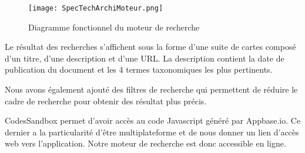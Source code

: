 \begin{figure}[h!]
  \centering
	\texttt{[image: SpecTechArchiMoteur.png]}
	\caption[]{Diagramme fonctionnel du moteur de recherche}
  \label{}
\end{figure}

Le résultat des recherches s'affichent sous la forme d'une suite de cartes composé d'un titre, d'une description et d'une URL\@.
La description contient la date de publication du document et les 4 termes taxonomiques les plus pertinents.

Nous avons également ajouté des filtres de recherche qui permettent de réduire le cadre de recherche pour obtenir des résultat plus précis.

CodesSandbox permet d'avoir accès au code Javascript généré par Appbase.io.
Ce dernier a la particularité d'être multiplateforme et de nous donner un lien d'accès web vers l'application.
Notre moteur de recherche est donc accessible en ligne.
